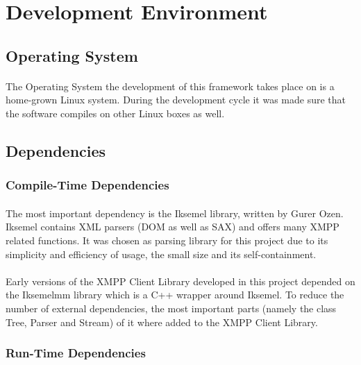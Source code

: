 \section{Development Environment}
\paragraph{}

\subsection{Operating System}
\paragraph{}
The Operating System the development of this framework takes place on is a home-grown Linux system. During the development cycle it was made sure that the software compiles on other Linux boxes as well.

\subsection{Dependencies}
\label{sec:depend}


\subsubsection{Compile-Time Dependencies}
\paragraph{}
The most important dependency is the Iksemel library, written by Gurer Ozen. Iksemel contains XML parsers (DOM as well as SAX) and offers many XMPP related functions. It was chosen as parsing library for this project due to its simplicity and efficiency of usage, the small size and its self-containment.

\paragraph{}
Early versions of the XMPP Client Library developed in this project depended on the Iksemelmm library which is a C++ wrapper around Iksemel. To reduce the number of external dependencies, the most important parts (namely the class Tree, Parser and Stream) of it where added to the XMPP Client Library.


\subsubsection{Run-Time Dependencies}
